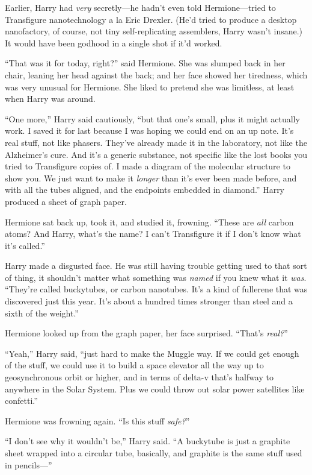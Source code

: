 Earlier, Harry had \emph{very} secretly—he hadn’t even told Hermione—tried to Transfigure nanotechnology a la Eric Drexler. (He’d tried to produce a desktop nanofactory, of course, not tiny self-replicating assemblers, Harry wasn’t insane.) It would have been godhood in a single shot if it’d worked.

“That was it for today, right?” said Hermione. She was slumped back in her chair, leaning her head against the back; and her face showed her tiredness, which was very unusual for Hermione. She liked to pretend she was limitless, at least when Harry was around.

“One more,” Harry said cautiously, “but that one’s small, plus it might actually work. I saved it for last because I was hoping we could end on an up note. It’s real stuff, not like phasers. They’ve already made it in the laboratory, not like the Alzheimer’s cure. And it’s a generic substance, not specific like the lost books you tried to Transfigure copies of. I made a diagram of the molecular structure to show you. We just want to make it \emph{longer} than it’s ever been made before, and with all the tubes aligned, and the endpoints embedded in diamond.” Harry produced a sheet of graph paper.

Hermione sat back up, took it, and studied it, frowning. “These are \emph{all} carbon atoms? And Harry, what’s the name? I can’t Transfigure it if I don’t know what it’s called.”

Harry made a disgusted face. He was still having trouble getting used to that sort of thing, it shouldn’t matter what something was \emph{named} if you knew what it \emph{was}. “They’re called buckytubes, or carbon nanotubes. It’s a kind of fullerene that was discovered just this year. It’s about a hundred times stronger than steel and a sixth of the weight.”

Hermione looked up from the graph paper, her face surprised. “That’s \emph{real?}”

“Yeah,” Harry said, “just hard to make the Muggle way. If we could get enough of the stuff, we could use it to build a space elevator all the way up to geosynchronous orbit or higher, and in terms of delta-v that’s halfway to anywhere in the Solar System. Plus we could throw out solar power satellites like confetti.”

Hermione was frowning again. “Is this stuff \emph{safe?}”

“I don’t see why it wouldn’t be,” Harry said. “A buckytube is just a graphite sheet wrapped into a circular tube, basically, and graphite is the same stuff used in pencils—”

